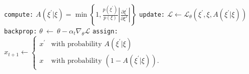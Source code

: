 \documentclass{article} %
\begin{document}
\begin{algorithm}[htpb]
{{      }
      \texttt{compute:} \(A(\xi^{\prime}|\xi) =%
      \min\left\{1,\frac{p(\xi^{\prime})}{p(\xi)}\left|\frac{\partial%
      \xi^{\prime}}{\partial \xi^{T}}\right|\right\}\)\;
      \texttt{update:} \(\mathcal{L}\leftarrow \mathcal{L}_{\theta}(\xi^{\prime},\xi,%
      A(\xi^{\prime}|\xi))\)\;
      \texttt{backprop:} \(\theta\ \leftarrow\ \theta-\alpha_t \nabla_{\theta} \mathcal{L}\)\;
      \texttt{assign:} \(x_{t+1} \leftarrow
      \begin{cases}
         x^{\prime} &\mbox{with probability } A(\xi^{\prime}|\xi) \\
         x &\mbox{with probability } (1 - A(\xi^{\prime}|\xi)).%
      \end{cases}%
      \)\;
   }\;
\end{algorithm}%
%
%
\end{document}
